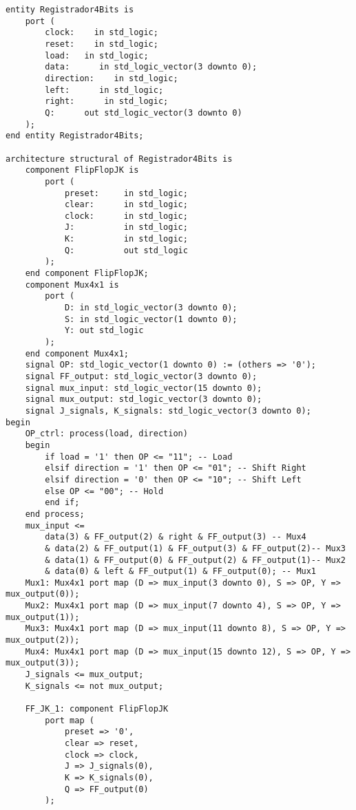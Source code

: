 \documentclass[a4paper,12pt]{article}
\newenvironment{code}{\captionsetup{type=listing}}{}
\begin{document}
\begin{code}
    \begin{verbatim}
entity Registrador4Bits is
    port (
        clock:    in std_logic;
        reset:    in std_logic;
        load:   in std_logic;
        data:      in std_logic_vector(3 downto 0);
        direction:    in std_logic;
        left:      in std_logic;
        right:      in std_logic;
        Q:      out std_logic_vector(3 downto 0)
    );
end entity Registrador4Bits;

architecture structural of Registrador4Bits is
    component FlipFlopJK is
        port (
            preset:     in std_logic;
            clear:      in std_logic;
            clock:      in std_logic;
            J:          in std_logic;
            K:          in std_logic;
            Q:          out std_logic
        );
    end component FlipFlopJK;
    component Mux4x1 is
        port (
            D: in std_logic_vector(3 downto 0);
            S: in std_logic_vector(1 downto 0);
            Y: out std_logic
        );
    end component Mux4x1;
    signal OP: std_logic_vector(1 downto 0) := (others => '0');
    signal FF_output: std_logic_vector(3 downto 0);
    signal mux_input: std_logic_vector(15 downto 0);
    signal mux_output: std_logic_vector(3 downto 0);
    signal J_signals, K_signals: std_logic_vector(3 downto 0);
begin
    OP_ctrl: process(load, direction)
    begin
        if load = '1' then OP <= "11"; -- Load
        elsif direction = '1' then OP <= "01"; -- Shift Right
        elsif direction = '0' then OP <= "10"; -- Shift Left
        else OP <= "00"; -- Hold
        end if;
    end process;
    mux_input <=
        data(3) & FF_output(2) & right & FF_output(3) -- Mux4
        & data(2) & FF_output(1) & FF_output(3) & FF_output(2)-- Mux3
        & data(1) & FF_output(0) & FF_output(2) & FF_output(1)-- Mux2
        & data(0) & left & FF_output(1) & FF_output(0); -- Mux1
    Mux1: Mux4x1 port map (D => mux_input(3 downto 0), S => OP, Y => mux_output(0));
    Mux2: Mux4x1 port map (D => mux_input(7 downto 4), S => OP, Y => mux_output(1));
    Mux3: Mux4x1 port map (D => mux_input(11 downto 8), S => OP, Y => mux_output(2));
    Mux4: Mux4x1 port map (D => mux_input(15 downto 12), S => OP, Y => mux_output(3));
    J_signals <= mux_output;
    K_signals <= not mux_output;

    FF_JK_1: component FlipFlopJK
        port map (
            preset => '0',
            clear => reset,
            clock => clock,
            J => J_signals(0),
            K => K_signals(0),
            Q => FF_output(0)
        );


\end{verbatim}
\end{code}
\end{document}
